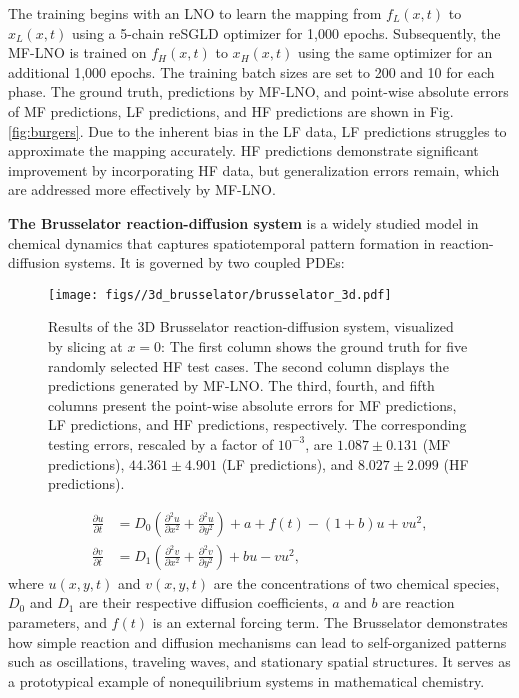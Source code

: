 The training begins with an LNO to learn the mapping from $f_L(x, t)$ to $x_L(x, t)$ using a 5-chain reSGLD optimizer for 1,000 epochs. Subsequently, the MF-LNO is trained on $f_H(x, t)$ to $x_H(x, t)$ using the same optimizer for an additional 1,000 epochs. The training batch sizes are set to 200 and 10 for each phase. The ground truth, predictions by MF-LNO, and point-wise absolute errors of MF predictions, LF predictions, and HF predictions are shown in Fig. \ref{fig:burgers}. Due to the inherent bias in the LF data, LF predictions struggles to approximate the mapping accurately. HF predictions demonstrate significant improvement by incorporating HF data, but generalization errors remain, which are addressed more effectively by MF-LNO.

\textbf{The Brusselator reaction-diffusion system} is a widely studied model in chemical dynamics that captures spatiotemporal pattern formation in reaction-diffusion systems. It is governed by two coupled PDEs:

\begin{figure}[!htbp]
    \centering
    \texttt{[image: figs//3d\_brusselator/brusselator\_3d.pdf]}
    \caption{Results of the 3D Brusselator reaction-diffusion system, visualized by slicing at $x=0$: The first column shows the ground truth for five randomly selected HF test cases. The second column displays the predictions generated by MF-LNO. The third, fourth, and fifth columns present the point-wise absolute errors for MF predictions, LF predictions, and HF predictions, respectively. The corresponding testing errors, rescaled by a factor of $10^{-3}$, are ${1.087} \pm {0.131}$ (MF predictions), $44.361 \pm 4.901$ (LF predictions), and $8.027 \pm 2.099$ (HF predictions).}
    \label{fig:brusselator}
\end{figure}
\begin{equation}\label{eq:brusselator}
    \begin{aligned}
    \frac{\partial u}{\partial t} &= D_0\left(\frac{\partial^2 u}{\partial x^2} + \frac{\partial^2 u}{\partial y^2}\right) + a + f(t) - (1+b)u + vu^2, \\
    \frac{\partial v}{\partial t} &= D_1\left(\frac{\partial^2 v}{\partial x^2} + \frac{\partial^2 v}{\partial y^2}\right) + bu - vu^2,
    \end{aligned}
\end{equation}
where $u(x, y, t)$ and $v(x, y, t)$ are the concentrations of two chemical species, $D_0$ and $D_1$ are their respective diffusion coefficients, $a$ and $b$ are reaction parameters, and $f(t)$ is an external forcing term. The Brusselator demonstrates how simple reaction and diffusion mechanisms can lead to self-organized patterns such as oscillations, traveling waves, and stationary spatial structures. It serves as a prototypical example of nonequilibrium systems in mathematical chemistry.

